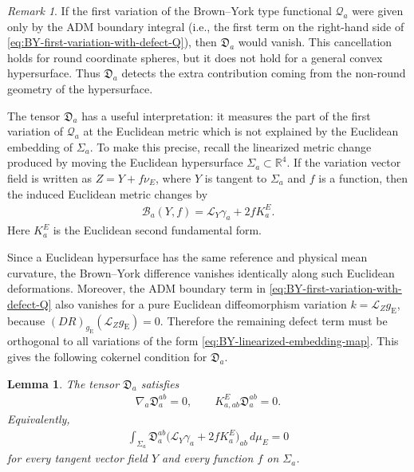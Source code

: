 \documentclass[10pt]{amsart}
\newcommand{\R}{\mathbb{R}}
\newcommand{\gE}{g_{\mathrm{E}}}
\newcommand{\Lie}{\mathcal{L}}
\theoremstyle{plain}
\newtheorem{lemma}[theorem]{Lemma}
\theoremstyle{remark}
\newtheorem{remark}[theorem]{Remark}
\begin{document}
	
	\begin{remark}
		If the first variation of the Brown--York type functional $\mathcal Q_a$ were given only by
		the ADM boundary integral (i.e., the first term on the right-hand side of \eqref{eq:BY-first-variation-with-defect-Q}), then $\mathfrak D_a$ would vanish. This cancellation holds for round coordinate
		spheres, but it does not hold for a general convex hypersurface. Thus
		$\mathfrak D_a$ detects the extra
		contribution coming from the non-round geometry of the hypersurface.
	\end{remark}
	
	\medskip
	
	The tensor $\mathfrak D_a$ has a useful interpretation: it measures the part of
	the first variation of $\mathcal Q_a$ at the Euclidean metric which is not
	explained by the Euclidean embedding of $\Sigma_a$. To make this precise, recall
	the linearized metric change produced by moving the Euclidean hypersurface
	$\Sigma_a\subset\R^4$. If the variation vector field is written as
	$Z=Y+f\nu_E$, where $Y$ is tangent to $\Sigma_a$ and $f$ is a function, then the
	induced Euclidean metric changes by
	\begin{align}\label{eq:BY-linearized-embedding-map}
		\mathscr B_a(Y,f)
		=
		\Lie_Y\gamma_a+2fK_a^E .
	\end{align}
	Here $K_a^E$ is the Euclidean second fundamental form.
	
	Since a Euclidean hypersurface has the same reference and physical mean
	curvature, the Brown--York difference vanishes identically along such Euclidean
	deformations. Moreover, the ADM boundary term in
	\eqref{eq:BY-first-variation-with-defect-Q} also vanishes for a pure Euclidean
	diffeomorphism variation $k=\Lie_Z\gE$, because
	$(DR)_{\gE}(\Lie_Z\gE)=0$. Therefore the remaining defect term must be
	orthogonal to all variations of the form
	\eqref{eq:BY-linearized-embedding-map}. This gives the following cokernel
	condition for $\mathfrak D_a$.
	
	\begin{lemma}\label{lem:BY-defect-cokernel}
		The tensor $\mathfrak D_a$ satisfies
		\begin{align}\label{eq:BY-defect-cokernel-equations}
			\nabla_a\mathfrak D_a^{ab}=0,
			\qquad
			K^E_{a,ab}\mathfrak D_a^{ab}=0 .
		\end{align}
		Equivalently,
		\begin{align}\label{eq:integral-orthogonality}
			\int_{\Sigma_a}
			\mathfrak D_a^{ab}
			\bigl(\Lie_Y\gamma_a+2fK_a^E\bigr)_{ab}\,d\mu_E
			=
			0
		\end{align}
		for every tangent vector field $Y$ and every function $f$ on $\Sigma_a$.
	\end{lemma}
	
\end{document}
